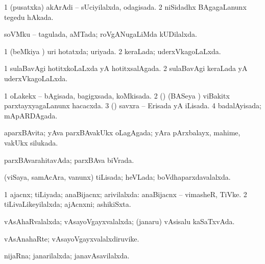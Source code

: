 \bentry
{} 
\gl{\gu}
\expl{}
\bmng
\bnum
\num{1} (pusatxka) akArAdi -- sUciyilalxda, odagisada. 
\num{2} niSidadhx BAgagaLanunx tegedu hAkada. 
\enum
\emng
\eentry

\bentry
{} 
\gl{\gu}
\expl{}
\bmng
soVMku -- tagulada, aMTada; roVgANugaLiMda kUDilalxda. 
\emng
\eentry

\bentry
{} 
\gl{\gu}
\expl{}
\bmng
\bnum
\num{1} (beMkiya \vi) uri hotatxda; uriyada. 
\num{2} keraLada; uderxVkagoLaLxda. 
\enum
\emng
\eentry

\bentry
{} 
\gl{\gu}
\expl{}
\bmng
\bnum
\num{1} sulaBavAgi hotitxkoLaLxda yA hotitxsalAgada. 
\num{2} sulaBavAgi keraLada yA uderxVkagoLaLxda. 
\enum
\emng
\eentry

\bentry
{} 
\gl{\gu}
\expl{}
\bmng
\bnum
\num{1} oLakekx -- bAgisada, bagigxsada, koMkisada. 
\num{2} (\vAyx) (BASeya \vi) viBakitx parxtayxyagaLanunx hacacxda. 
\num{3} (\saM) savxra -- Erisada yA iLisada. 
\num{4} badalAyisada; mApARDAgada. 
\enum
\emng
\eentry

\bentry
{} 
\gl{\gu}
\expl{}
\bmng
aparxBAvita; yAva parxBAvakUkx oLagAgada; yAra pArxbalayx, mahime, \mo vakUkx silukada. 
\emng
\eentry

\bentry
{} 
\gl{\gu}
\expl{}
\bmng
parxBAvarahitavAda; parxBAva biVrada. 
\emng
\eentry

\bentry
{} 
\gl{\gu}
\expl{}
\bmng
(viSaya, samAcAra, \mo vanunx) tiLisada; heVLada; boVdhaparxdavalalxda. 
\emng
\eentry

\bentry
{} 
\gl{\gu}
\expl{}
\bmng
\bnum
\num{1} ajacnx; tiLiyada; anaBijacnx; arivilalxda:  anaBijacnx -- vimasheR, TiVke. 
\num{2} tiLivaLikeyilalxda; ajAcnxni; ashikiSxta. 
\enum
\emng
\eentry

\bentry
{} 
\gl{\gu}
\expl{}
\bmng
vAsAhaRvalalxda; vAsayoVgayxvalalxda; (janaru) vAsisalu kaSaTxvAda. 
\emng
\eentry

\bentry
{} 
\gl{\nA}
\expl{}
\bmng
vAsAnahaRte; vAsayoVgayxvalalxdiruvike. 
\emng
\eentry

\bentry
{} 
\gl{\gu}
\expl{}
\bmng
nijaRna; janarilalxda; janavAsavilalxda. 
\emng
\eentry

